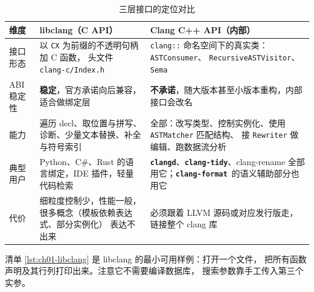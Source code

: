 \documentclass[12pt,a4paper,fontset=fandol]{ctexbook}
\newcommand{\Lib}[1]{\textbf{\texttt{#1}}}
\newcommand{\Tidy}{\Lib{clang-tidy}}
\newcommand{\Fmt}{\Lib{clang-format}}
\newcommand{\CD}{\Lib{clangd}}
\begin{document}
\begin{table}[htbp]
\centering
\caption{三层接口的定位对比}
\label{tab:ch01-api}
\begin{tabular}{@{}>{\raggedright\arraybackslash\small}p{}
                 >{\raggedright\arraybackslash\small}p{}
                 >{\raggedright\arraybackslash\small}p{}@{}}
\toprule
维度 & libclang（C API） & Clang C++ API（内部） \\
\midrule
接口形态 &
  以 \texttt{CX} 为前缀的不透明句柄加 C 函数，
  头文件 \texttt{clang-c/Index.h} &
  \texttt{clang::} 命名空间下的真实类：\texttt{ASTConsumer}、
  \texttt{RecursiveASTVisitor}、\texttt{Sema} \\
ABI 稳定性 &
  \textbf{稳定}，官方承诺向后兼容，适合做绑定层 &
  \textbf{不承诺}，随大版本甚至小版本重构，内部接口会改名 \\
能力 &
  遍历 decl、取位置与拼写、诊断、少量文本替换、补全与符号索引 &
  全部：改写类型、控制实例化、使用 \texttt{ASTMatcher} 匹配结构、
  接 \texttt{Rewriter} 做编辑、跑数据流分析 \\
典型用户 &
  Python、C\#、Rust 的语言绑定，IDE 插件，轻量代码检索 &
  \CD、\Tidy、clang-rename 全部用它；\Fmt\ 的语义辅助部分也用它 \\
代价 &
  细粒度控制少，性能一般，很多概念（模板依赖表达式、部分实例化）
  表达不出来 &
  必须跟着 LLVM 源码或对应发行版走，链接整个 clang 库 \\
\bottomrule
\end{tabular}
\end{table}

清单 \ref{lst:ch01-libclang} 是 libclang 的最小可用样例：打开一个文件，
把所有函数声明及其行列打印出来。注意它不需要编译数据库，
搜索参数靠手工传入第三个实参。
\end{document}
